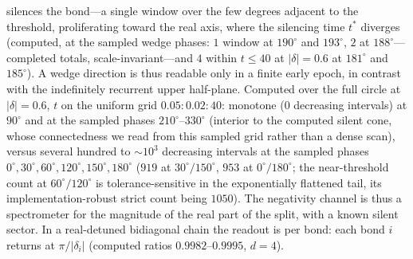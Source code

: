 ﻿\documentclass[11pt]{article}
\theoremstyle{remark}
\begin{document}
silences the bond---a single window over the few degrees adjacent
to the threshold, proliferating toward the real axis, where the
silencing time $t^*$ diverges (computed, at the sampled wedge
phases: $1$ window at $190^\circ$ and $193^\circ$, $2$ at
$188^\circ$---completed totals, scale-invariant---and $4$ within
$t\le40$ at $|\delta|=0.6$ at $181^\circ$ and $185^\circ$). A wedge direction is thus
readable only in a finite early epoch, in contrast with the
indefinitely recurrent upper half-plane.
Computed over the full circle at
$|\delta|=0.6$, $t$ on the uniform grid $0.05{:}0.02{:}40$:
monotone ($0$ decreasing intervals) at $90^\circ$ and at the
sampled phases
$210^\circ$--$330^\circ$ (interior to the computed silent cone, whose
connectedness we read from this sampled grid rather than a dense scan),
versus several hundred to ${\sim}10^3$ decreasing intervals at the
sampled phases $0^\circ,30^\circ,60^\circ,120^\circ,150^\circ,
180^\circ$ ($919$ at $30^\circ/150^\circ$, $953$ at
$0^\circ/180^\circ$; the near-threshold count at
$60^\circ/120^\circ$ is tolerance-sensitive in the exponentially
flattened tail, its implementation-robust strict count being
$1050$). The negativity channel is
thus a spectrometer for the magnitude of the real part of the split,
with a known
silent sector. In a
real-detuned bidiagonal chain the readout is per
bond: each bond $i$ returns at $\pi/|\delta_i|$ (computed ratios
$0.9982$--$0.9995$, $d=4$).
\end{document}
